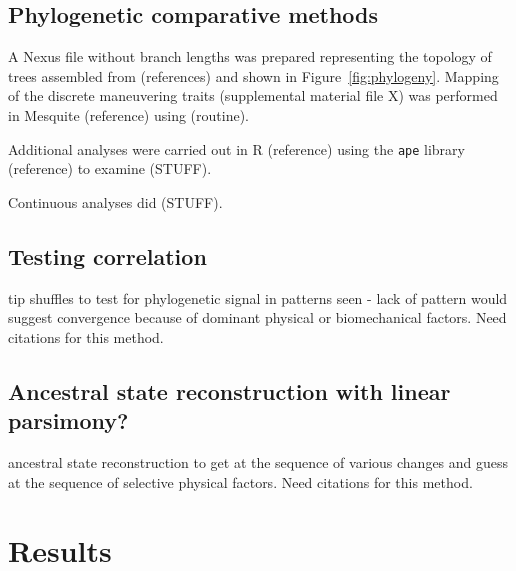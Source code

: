 \subsection{Phylogenetic comparative methods}
\label{sec:methods:phylo}
A Nexus file without branch lengths was prepared representing the topology of trees assembled from (references) and shown in Figure~\ref{fig:phylogeny}. Mapping of the discrete maneuvering traits (supplemental material file X) was performed in Mesquite (reference) using (routine). 

Additional analyses were carried out in R (reference) using the \texttt{ape} library (reference) to examine (STUFF).  

Continuous analyses did (STUFF).  

\subsection{Testing correlation}
tip shuffles to test for phylogenetic signal in patterns seen - lack of pattern would suggest convergence because of dominant physical or biomechanical factors.  Need citations for this method. \cite{Pagel:1999}

\subsection{Ancestral state reconstruction with linear parsimony?}
ancestral state reconstruction to get at the sequence of various changes and guess at the sequence of selective physical factors.  Need citations for this method. 






\section{Results}
